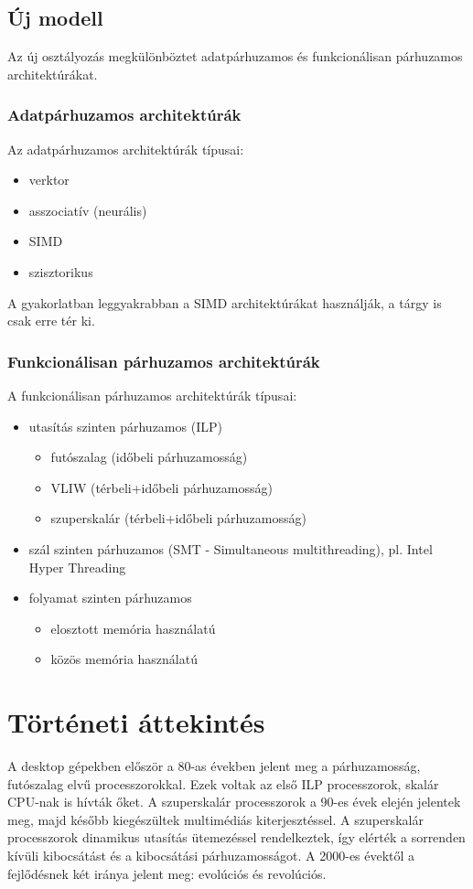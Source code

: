 \subsection{Új modell}
Az új osztályozás megkülönböztet adatpárhuzamos és funkcionálisan párhuzamos architektúrákat.
\subsubsection{Adatpárhuzamos architektúrák}
Az adatpárhuzamos architektúrák típusai:
\begin{itemize}
    \item verktor
    \item asszociatív (neurális)
    \item SIMD
    \item szisztorikus
\end{itemize}
A gyakorlatban leggyakrabban a SIMD architektúrákat használják, a tárgy is csak erre tér ki.
\subsubsection{Funkcionálisan párhuzamos architektúrák}
A funkcionálisan párhuzamos architektúrák típusai:
\begin{itemize}
    \item utasítás szinten párhuzamos (ILP)
    \begin{itemize}
        \item futószalag (időbeli párhuzamosság)
        \item VLIW (térbeli+időbeli párhuzamosság)
        \item szuperskalár (térbeli+időbeli párhuzamosság)
    \end{itemize}
    \item szál szinten párhuzamos (SMT - Simultaneous multithreading), pl. Intel Hyper Threading
    \item folyamat szinten párhuzamos
    \begin{itemize}
        \item elosztott memória használatú
        \item közös memória használatú
    \end{itemize}
\end{itemize}

\section{Történeti áttekintés}
A desktop gépekben először a 80-as években jelent meg a párhuzamosság, futószalag elvű processzorokkal.
Ezek voltak az első ILP processzorok, skalár CPU-nak is hívták őket.
A szuperskalár processzorok a 90-es évek elején jelentek meg, majd később kiegészültek multimédiás kiterjesztéssel.
A szuperskalár processzorok dinamikus utasítás ütemezéssel rendelkeztek, így elérték a sorrenden kívüli kibocsátást és a kibocsátási párhuzamosságot.
A 2000-es évektől a fejlődésnek két iránya jelent meg: evolúciós és revolúciós.
